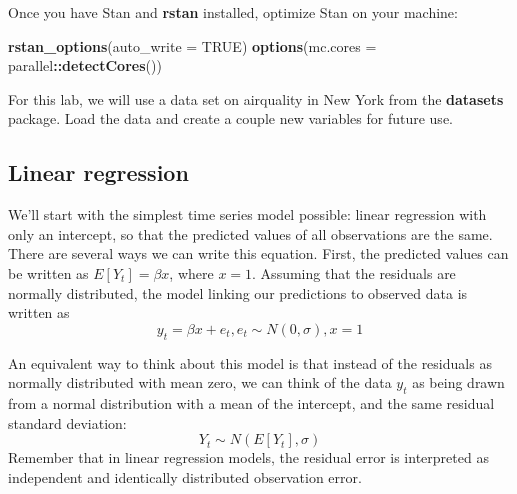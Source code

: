 \documentclass[
]{article}
\newenvironment{Shaded}{\begin{snugshade}}{\end{snugshade}}
\newcommand{\CommentTok}[1]{\textcolor[rgb]{0.56,0.35,0.01}{\textit{#1}}}
\newcommand{\DataTypeTok}[1]{\textcolor[rgb]{0.13,0.29,0.53}{#1}}
\newcommand{\KeywordTok}[1]{\textcolor[rgb]{0.13,0.29,0.53}{\textbf{#1}}}
\newcommand{\NormalTok}[1]{#1}
\newcommand{\OperatorTok}[1]{\textcolor[rgb]{0.81,0.36,0.00}{\textbf{#1}}}
\newcommand{\OtherTok}[1]{\textcolor[rgb]{0.56,0.35,0.01}{#1}}
\newcommand{\StringTok}[1]{\textcolor[rgb]{0.31,0.60,0.02}{#1}}
\begin{document}
Once you have Stan and \textbf{rstan} installed, optimize Stan on your
machine:

\begin{Shaded}
\begin{Highlighting}[]
\KeywordTok{rstan_options}\NormalTok{(}\DataTypeTok{auto_write =} \OtherTok{TRUE}\NormalTok{)}
\KeywordTok{options}\NormalTok{(}\DataTypeTok{mc.cores =}\NormalTok{ parallel}\OperatorTok{::}\KeywordTok{detectCores}\NormalTok{())}
\end{Highlighting}
\end{Shaded}

For this lab, we will use a data set on airquality in New York from the
\textbf{datasets} package. Load the data and create a couple new
variables for future use.

\begin{Shaded}
\end{Shaded}

\hypertarget{sec-stan-lr}{%
\subsection{Linear regression}\label{sec-stan-lr}}

We'll start with the simplest time series model possible: linear
regression with only an intercept, so that the predicted values of all
observations are the same. There are several ways we can write this
equation. First, the predicted values can be written as
\(E[Y_{t}] = \beta x\), where \(x=1\). Assuming that the residuals are
normally distributed, the model linking our predictions to observed data
is written as \[y_t = \beta x + e_{t}, e_{t} \sim N(0,\sigma), x=1\]

An equivalent way to think about this model is that instead of the
residuals as normally distributed with mean zero, we can think of the
data \(y_t\) as being drawn from a normal distribution with a mean of
the intercept, and the same residual standard deviation:
\[Y_t \sim N(E[Y_{t}],\sigma)\] Remember that in linear regression
models, the residual error is interpreted as independent and identically
distributed observation error.
\end{document}
